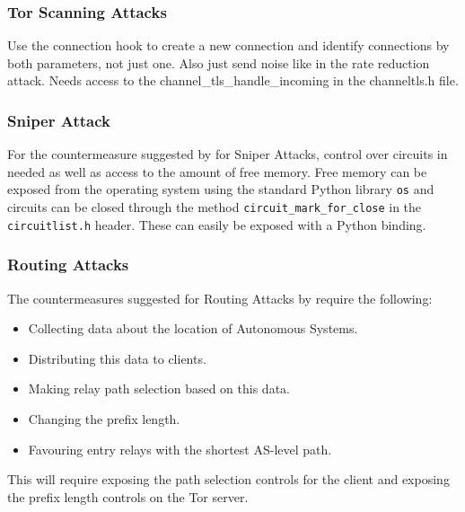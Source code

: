 \documentclass[9pt,technote]{IEEEtran}
\begin{document}
\subsubsection{Tor Scanning Attacks}
Use the connection hook to create a new connection and identify connections by
both parameters, not just one. Also just send noise like in the rate reduction
attack. Needs access to the channel\_tls\_handle\_incoming in the channeltls.h file.

\subsubsection{Sniper Attack}
For the countermeasure suggested by \citeauthor{jansen2014sniper} for Sniper Attacks, control over circuits in needed as well as access to the amount of free memory. Free memory can be exposed from the operating system using the standard Python library \texttt{os} and circuits can
be closed through the method \texttt{circuit\_mark\_for\_close} in the
\texttt{circuitlist.h} header. These can easily be exposed with a Python
binding.\\

\subsubsection{Routing Attacks}
The countermeasures suggested for Routing Attacks by \citeauthor{sun2015raptor} require the following:
\begin{itemize}
\item Collecting data about the location of Autonomous Systems.
\item Distributing this data to clients.
\item Making relay path selection based on this data.
\item Changing the prefix length.
\item Favouring entry relays with the shortest AS-level path.
\end{itemize}

This will require exposing the path selection controls for the client and exposing the prefix length controls on the Tor server.
\end{document}
